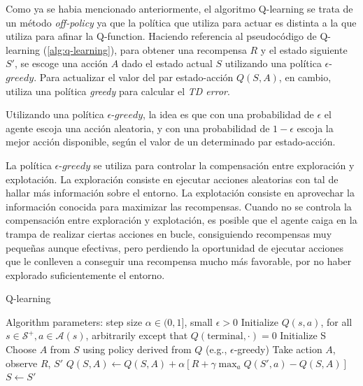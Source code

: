 Como ya se habia mencionado anteriormente, el algoritmo Q-learning se trata de un método \emph{off-policy} ya que la política que utiliza para actuar es distinta a la que utiliza para afinar la Q-function. Haciendo referencia al pseudocódigo de Q-learning (\ref{alg:q-learning}), para obtener una recompensa $R$ y el estado siguiente $S'$, se escoge una acción $A$ dado el estado actual $S$ utilizando una política $\epsilon$-$greedy$. Para actualizar el valor del par estado-acción $Q(S, A)$, en cambio, utiliza una política \emph{greedy} para calcular el \emph{TD error}.

Utilizando una política $\epsilon$-$greedy$, la idea es que con una probabilidad de $\epsilon$ el agente escoja una acción aleatoria, y con una probabilidad de $1-\epsilon$ escoja la mejor acción disponible, según el valor de un determinado par estado-acción.

\newpage

La política $\epsilon$-$greedy$ se utiliza para controlar la compensación entre exploración y explotación. La exploración consiste en ejecutar acciones aleatorias con tal de hallar más información sobre el entorno. La explotación consiste en aprovechar la información conocida para maximizar las recompensas. Cuando no se controla la compensación entre exploración y explotación, es posible que el agente caiga en la trampa de realizar ciertas acciones en bucle, consiguiendo recompensas muy pequeñas aunque efectivas, pero perdiendo la oportunidad de ejecutar acciones que le conlleven a conseguir una recompensa mucho más favorable, por no haber explorado suficientemente el entorno.

\begin{algorithm}[H]
\caption{Q-learning}
\label{alg:q-learning}
\begin{algorithmic}
    \State Algorithm parameters: step size $\alpha \in (0, 1]$, small $\epsilon > 0$
    \State Initialize $Q(s, a)$, for all $s \in \mathcal{S}^+, a \in \mathcal{A}(s)$, arbitrarily except that $Q(\mathrm{terminal}, \cdot) = 0$
        \State Initialize S
            \State Choose $A$ from $S$ using policy derived from $Q$ (e.g., $\epsilon$-greedy)
            \State Take action $A$, observe $R$, $S'$
            \State $Q(S, A) \leftarrow Q(S, A) + \alpha [R + \gamma \max_a  Q(S', a) - Q(S, A)]$
            \State $S \leftarrow S'$
        \EndFor
    \EndFor
\end{algorithmic}
\end{algorithm}


